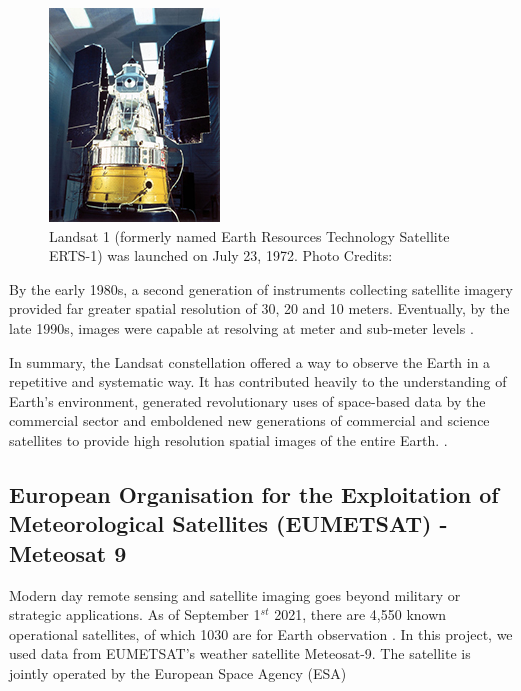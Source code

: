 \begin{figure}[H]
\centering

\includegraphics[totalheight=0.2\textheight]{Landsat1.jpg}
\caption{Landsat 1 (formerly named Earth Resources Technology Satellite ERTS-1) was launched on July 23, 1972. Photo Credits: \cite{landsat1}
}
\end{figure}

By the early 1980s, a second generation of instruments collecting satellite imagery provided far greater spatial resolution of 30, 20 and 10 meters. Eventually, by the late 1990s, images were capable at resolving at meter and  sub-meter levels \cite{campbell2011introduction}.

\par

In summary, the Landsat constellation offered a way to observe the Earth in a repetitive and systematic way. It has contributed heavily to the understanding of Earth's environment, generated revolutionary uses of space-based data by the commercial sector and emboldened new generations of commercial and science satellites to provide high resolution spatial images of the entire Earth. \cite{campbell2011introduction, Williams:2006:0099-1112:1171}.


\subsection{European Organisation for the Exploitation of Meteorological Satellites (EUMETSAT) - Meteosat 9}

Modern day remote sensing and satellite imaging goes beyond military or strategic applications. As of September 1$^{st}$ 2021, there are 4,550 known operational satellites, of which 1030 are for Earth observation \cite{Sat_Data}. In this project, we used data from EUMETSAT's weather satellite Meteosat-9. The satellite is jointly operated by the European Space Agency (ESA)



